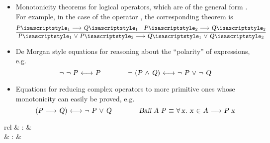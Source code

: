 \begin{isabellebody}
\begin{isamarkuptext}
\begin{itemize}
  \item Monotonicity theorems for logical operators, which are of the
  general form \isa{{\isachardoublequote}{\isacharparenleft}{\isasymdots}\ {\isasymlongrightarrow}\ {\isasymdots}{\isacharparenright}\ {\isasymLongrightarrow}\ {\isasymdots}\ {\isacharparenleft}{\isasymdots}\ {\isasymlongrightarrow}\ {\isasymdots}{\isacharparenright}\ {\isasymLongrightarrow}\ {\isasymdots}\ {\isasymlongrightarrow}\ {\isasymdots}{\isachardoublequote}}.  For example, in
  the case of the operator \isa{{\isachardoublequote}{\isasymor}{\isachardoublequote}}, the corresponding theorem is
  \[
  \infer{\isa{{\isachardoublequote}P\isactrlsub {\isadigit{1}}\ {\isasymor}\ P\isactrlsub {\isadigit{2}}\ {\isasymlongrightarrow}\ Q\isactrlsub {\isadigit{1}}\ {\isasymor}\ Q\isactrlsub {\isadigit{2}}{\isachardoublequote}}}{\isa{{\isachardoublequote}P\isactrlsub {\isadigit{1}}\ {\isasymlongrightarrow}\ Q\isactrlsub {\isadigit{1}}{\isachardoublequote}} & \isa{{\isachardoublequote}P\isactrlsub {\isadigit{2}}\ {\isasymlongrightarrow}\ Q\isactrlsub {\isadigit{2}}{\isachardoublequote}}}
  \]

  \item De Morgan style equations for reasoning about the ``polarity''
  of expressions, e.g.
  \[
  \isa{{\isachardoublequote}{\isasymnot}\ {\isasymnot}\ P\ {\isasymlongleftrightarrow}\ P{\isachardoublequote}} \qquad\qquad
  \isa{{\isachardoublequote}{\isasymnot}\ {\isacharparenleft}P\ {\isasymand}\ Q{\isacharparenright}\ {\isasymlongleftrightarrow}\ {\isasymnot}\ P\ {\isasymor}\ {\isasymnot}\ Q{\isachardoublequote}}
  \]

  \item Equations for reducing complex operators to more primitive
  ones whose monotonicity can easily be proved, e.g.
  \[
  \isa{{\isachardoublequote}{\isacharparenleft}P\ {\isasymlongrightarrow}\ Q{\isacharparenright}\ {\isasymlongleftrightarrow}\ {\isasymnot}\ P\ {\isasymor}\ Q{\isachardoublequote}} \qquad\qquad
  \isa{{\isachardoublequote}Ball\ A\ P\ {\isasymequiv}\ {\isasymforall}x{\isachardot}\ x\ {\isasymin}\ A\ {\isasymlongrightarrow}\ P\ x{\isachardoublequote}}
  \]

  \end{itemize}

\end{isamarkuptext}%
\isamarkuptrue%
%
\isamarkuptrue%
%
\begin{isamarkuptext}%
\begin{matharray}{rcl}
    \hypertarget{method.HOL.arith}{\hyperlink{method.HOL.arith}{\mbox{}}} & : &  \\
    \hypertarget{attribute.HOL.arith-split}{\hyperlink{attribute.HOL.arith-split}{\mbox{}}} & : &  \\
  \end{matharray}


\end{isamarkuptext}
\end{isabellebody}
